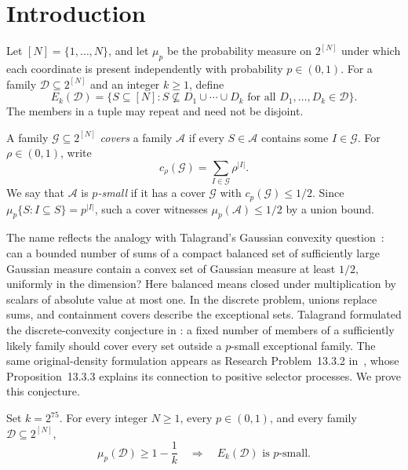 \section{Introduction}
\label{sec:introduction}

Let $[N]=\{1,\ldots,N\}$, and let $\mu_p$ be the probability measure
on $2^{[N]}$ under which each coordinate is present independently with
probability $p\in(0,1)$. For a family $\mathcal D\subseteq2^{[N]}$ and
an integer $k\ge1$, define
\begin{equation}
\label{eq:exceptional-definition}
E_k(\mathcal D)
=\bigl\{S\subseteq[N]:
  S\nsubseteq D_1\cup\cdots\cup D_k
  \text{ for all }D_1,\ldots,D_k\in\mathcal D\bigr\}.
\end{equation}
The members in a tuple may repeat and need not be disjoint.

A family $\mathcal G\subseteq2^{[N]}$ \emph{covers} a family
$\mathcal A$ if every $S\in\mathcal A$ contains some $I\in\mathcal G$.
For $\rho\in(0,1)$, write
\[
c_\rho(\mathcal G)=\sum_{I\in\mathcal G}\rho^{|I|}.
\]
We say that $\mathcal A$ is \emph{$p$-small} if it has a cover
$\mathcal G$ with $c_p(\mathcal G)\le1/2$.
Since $\mu_p\{S:I\subseteq S\}=p^{|I|}$, such a cover witnesses
$\mu_p(\mathcal A)\le1/2$ by a union bound.

The name reflects the analogy with Talagrand's Gaussian convexity
question~\cite[Conjecture~2.1]{Talagrand10}: can a bounded number of
sums of a compact balanced set of sufficiently large Gaussian measure
contain a convex set of Gaussian measure at least $1/2$, uniformly in
the dimension? Here balanced means closed under multiplication by
scalars of absolute value at most one. In the discrete problem, unions
replace sums, and containment covers describe the exceptional sets.
Talagrand formulated the discrete-convexity conjecture in
\cite[Conjecture~7.1]{Talagrand10}: a fixed number of members of a
sufficiently likely family should cover every set outside a $p$-small
exceptional family. The same original-density formulation appears as
Research Problem~13.3.2 in~\cite{Talagrand21}, whose
Proposition~13.3.3 explains its connection to positive selector processes.
We prove this conjecture.

\begin{theorem}
\label{thm:main}
Set $k=2^{75}$. For every integer $N\ge1$, every $p\in(0,1)$, and every
family $\mathcal D\subseteq2^{[N]}$,
\[
\mu_p(\mathcal D)\ge1-\frac1k
\quad\Longrightarrow\quad
E_k(\mathcal D)\text{ is }p\text{-small}.
\]
\end{theorem}

